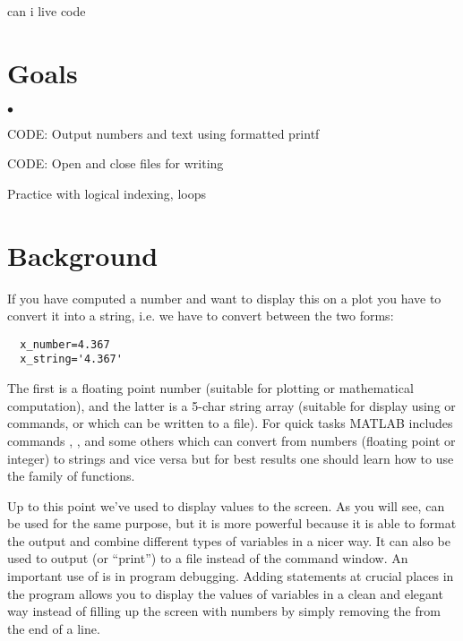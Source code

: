 \documentclass[letterpaper]{article}
\newcounter{lnum}
\newenvironment{abbrevlist}%
  {\begin{list}{$\bullet$}{\setlength{\leftmargin}{2em}%
               \setlength{\itemindent}{0em}%
               \setlength{\itemsep}{0pt}%
               \setlength{\parsep}{0pt}%
               \setlength{\topsep}{2pt}%
               \usecounter{lnum} } }{\end{list}}
\begin{document}
can i live code
\section{Goals}
\begin{abbrevlist}
\item CODE: Output numbers and text using formatted printf 
\item CODE: Open and close files for writing
\item Practice with logical indexing, loops
\end{abbrevlist}

\section{Background}

If you have computed a number and want to display this on a plot you have to convert it into
a string, i.e. we have to convert between the two forms:
\begin{lstlisting}
  x_number=4.367          
  x_string='4.367'
\end{lstlisting}
The first is a floating point number (suitable for plotting or mathematical computation), 
and the latter is a 5-char string array (suitable for display using  or 
commands, or which can be written to a file). For quick tasks MATLAB includes commands , , 
and some others which can convert from numbers (floating point or integer) to strings and
vice versa but for best results one should learn how to use the  family
of functions. 


Up to this point we've used  to display values to the screen. 
As you will see,  can be used for the same purpose, but it is more powerful because it is able to 
format the output and combine different types of variables in a nicer way. It can also be used to output (or ``print'') to a file instead of the command window.
An important use of   is in program debugging. Adding
 statements at crucial places in the program allows you to display the
values of variables in a clean and elegant way instead of filling up the screen with numbers
by simply removing the \mcode{;} from the end of a line.
\end{document}
